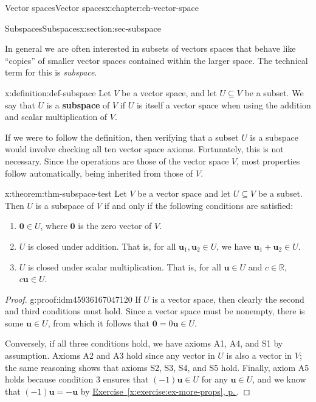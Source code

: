 \documentclass[oneside,10pt,]{book}
\newcommand{\xreffont}{\relax}
\newcommand{\terminology}[1]{\textbf{#1}}
\numberwithin{equation}{section}
\newcommand{\R}{\mathbb{R}}
\newcommand{\uu}{\mathbf{u}}
\newcommand{\zer}{\mathbf{0}}
\begin{document}
\begin{chapterptx}{Vector spaces}{}{Vector spaces}{}{}{x:chapter:ch-vector-space}
\begin{sectionptx}{Subspaces}{}{Subspaces}{}{}{x:section:sec-subspace}
\par
In general we are often interested in subsets of vectors spaces that behave like ``copies'' of smaller vector spaces contained within the larger space. The technical term for this is \emph{subspace}.%
\begin{definition}{}{x:definition:def-subspace}%
Let \(V\) be a vector space, and let \(U\subseteq V\) be a subset. We say that \(U\) is a \terminology{subspace} of \(V\) if \(U\) is itself a vector space when using the addition and scalar multiplication of \(V\).%
\end{definition}
If we were to follow the definition, then verifying that a subset \(U\) is a subspace would involve checking all ten vector space axioms. Fortunately, this is not necessary. Since the operations are those of the vector space \(V\), most properties follow automatically, being inherited from those of \(V\).%
\begin{theorem}{}{}{x:theorem:thm-subspace-test}%
Let \(V\) be a vector space and let \(U\subseteq V\) be a subset. Then \(U\) is a subspace of \(V\) if and only if the following conditions are satisfied:%
\begin{enumerate}
\item{}\(\zer\in U\), where \(\zer\) is the zero vector of \(V\).%
\item{}\(U\) is closed under addition. That is, for all \(\uu_1,\uu_2\in U\), we have \(\uu_1+\uu_2\in U\).%
\item{}\(U\) is closed under scalar multiplication. That is, for all \(\uu\in U\) and \(c\in\R\), \(c\uu\in U\).%
\end{enumerate}
%
\end{theorem}
\begin{proof}{}{g:proof:idm45936167047120}
If \(U\) is a vector space, then clearly the second and third conditions must hold. Since a vector space must be nonempty, there is some \(\uu\in U\), from which it follows that \(\zer=0\uu\in U\).%
\par
Conversely, if all three conditions hold, we have axioms A1, A4, and S1 by assumption. Axioms A2 and A3 hold since any vector in \(U\) is also a vector in \(V\); the same reasoning shows that axioms S2, S3, S4, and S5 hold. Finally, axiom A5 holds because condition 3 ensures that \((-1)\uu\in U\) for any \(\uu\in U\), and we know that \((-1)\uu=-\uu\) by \hyperref[x:exercise:ex-more-props]{Exercise~{\xreffont\ref{x:exercise:ex-more-props}}, p.\,\pageref{x:exercise:ex-more-props}}.%
\end{proof}

\end{sectionptx}
\end{chapterptx}
\end{document}
